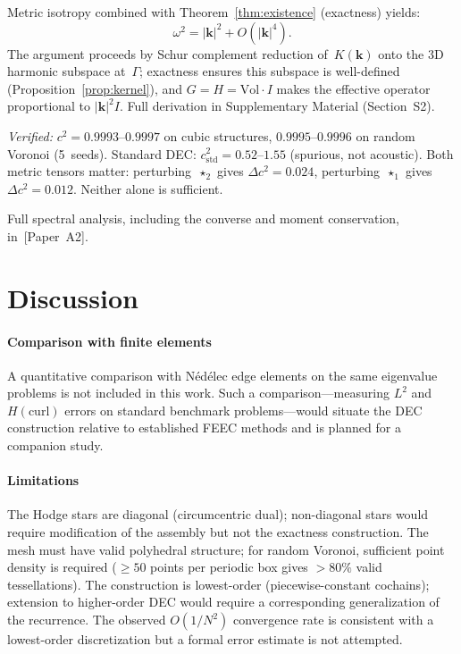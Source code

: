 \documentclass[12pt]{article}
\theoremstyle{definition}
\theoremstyle{remark}
\newcommand{\kk}{\mathbf{k}}
\newcommand{\Vol}{\mathrm{Vol}}
\begin{document}
Metric isotropy combined with Theorem~\ref{thm:existence} (exactness) yields:
\begin{equation}\label{eq:dispersion}
  \omega^2 = |\kk|^2 + O(|\kk|^4).
\end{equation}
The argument proceeds by Schur complement reduction of~$K(\kk)$ onto the 3D
harmonic subspace at~$\Gamma$; exactness ensures this subspace is well-defined
(Proposition~\ref{prop:kernel}), and $G = H = \Vol\cdot I$ makes the effective
operator proportional to $|\kk|^2 I$. Full derivation in Supplementary
Material (Section~S2).

\emph{Verified:} $c^2 = 0.9993$--$0.9997$ on cubic structures,
$0.9995$--$0.9996$ on random Voronoi (5~seeds). Standard DEC:
$c^2_{\mathrm{std}} = 0.52$--$1.55$ (spurious, not acoustic). Both metric
tensors matter: perturbing~$\star_2$ gives $\Delta c^2 = 0.024$,
perturbing~$\star_1$ gives $\Delta c^2 = 0.012$. Neither alone is sufficient.

Full spectral analysis, including the converse and moment conservation,
in~[Paper~A2].

\section{Discussion}
\label{sec:discussion}

\paragraph{Comparison with finite elements}
A quantitative comparison with N\'ed\'elec edge elements on the same eigenvalue
problems is not included in this work. Such a comparison---measuring $L^2$ and
$H(\mathrm{curl})$ errors on standard benchmark problems---would situate the
DEC construction relative to established FEEC methods and is planned for a
companion study.

\paragraph{Limitations}
The Hodge stars are diagonal (circumcentric dual); non-diagonal stars would
require modification of the assembly but not the exactness construction. The
mesh must have valid polyhedral structure; for random Voronoi, sufficient point
density is required ($\geq 50$ points per periodic box gives $> 80\%$ valid
tessellations). The construction is lowest-order (piecewise-constant cochains);
extension to higher-order DEC would require a corresponding generalization of
the recurrence. The observed $O(1/N^2)$ convergence rate is consistent with a
lowest-order discretization but a formal error estimate is not attempted.
\end{document}
